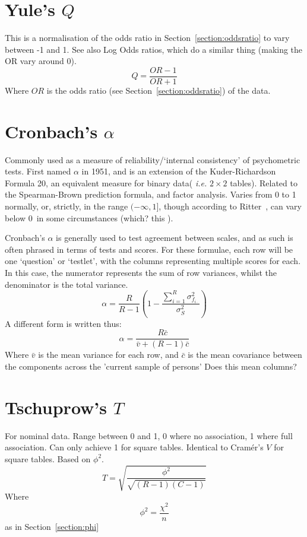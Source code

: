 \documentclass[11pt]{article}
\begin{document}
\section{Yule's $Q$}
This is a normalisation of the odds ratio in Section~\ref{section:oddsratio} to vary between -1 and 1.  See also Log Odds ratios, which do a similar thing (making the OR vary around 0).
$$
Q = \frac{OR - 1}{OR + 1}
$$
Where $OR$ is the odds ratio (see Section~\ref{section:oddsratio}) of the data.




\section{Cronbach's $\alpha$}
Commonly used as a measure of reliability/`internal consistency' of psychometric tests.  First named $\alpha$ in 1951, and is an extension of the Kuder-Richardson Formula 20, an equivalent measure for binary data( \textsl{i.e.} $2\times 2$ tables).  Related to the Spearman-Brown prediction formula, and factor analysis.  Varies from 0 to 1 normally, or, strictly, in the range $(-\infty, 1]$, though according to Ritter~\cite{ritter2010understanding}, can vary below 0~in some circumstances {\color{red} (which? this \cite{cronbachalphanegative} )}. \cite{bland1997statistics}

Cronbach's $\alpha$ is generally used to test agreement between scales, and as such is often phrased in terms of tests and scores.  For these formulae, each row will be one `question' or `testlet', with the columns representing multiple scores for each.  In this case, the numerator represents the sum of row variances, whilst the denominator is the total variance.
$$
\alpha = \frac{ R }{ R - 1 }   \left( 1 - \frac{ \sum_{i=1}^{R}{ \sigma_{f_{i\cdot}}^2 }    }{  \sigma_{S}^2  } \right) 
$$
A different form is written thus:
$$
\alpha = \frac{ R\bar{c} }{ \bar{v} + (R - 1)\bar{c} }
$$
Where $\bar{v}$ is the mean variance for each row, and $\bar{c}$ is the mean covariance between the components across the 'current sample of persons' {\color{red} Does this mean columns?}



\section{Tschuprow's $T$}
For nominal data.  Range between 0 and 1, 0 where no association, 1 where full association.  Can only achieve 1 for square tables. Identical to Cram\'er's $V$ for square tables.  Based on $\phi^2$.
$$
T = \sqrt{ \frac{ \phi^2 }{ \sqrt{ (R-1)(C-1) } } }
$$
Where 
$$
\phi^2 = \frac{\chi^2}{n}
$$
as in Section~\ref{section:phi}
\end{document}
